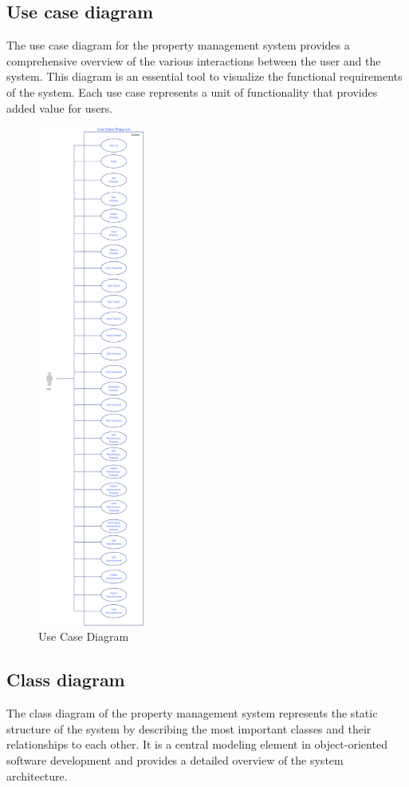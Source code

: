 \subsection{Use case diagram}
The use case diagram for the property management system provides a comprehensive overview of the various interactions between the user and the system. This diagram is an essential tool to visualize the functional requirements of the system. Each use case represents a unit of functionality that provides added value for users.
\begin{figure}[h]
\centering
\includegraphics[height=16.50cm]{usecasediagram.png}
\caption{Use Case Diagram}
\label{fig:use-case-diagram}
\end{figure}

\newpage
\subsection{Class diagram}
The class diagram of the property management system represents the static structure of the system by describing the most important classes and their relationships to each other. It is a central modeling element in object-oriented software development and provides a detailed overview of the system architecture.

